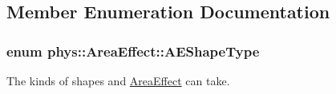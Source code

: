 \subsection{Member Enumeration Documentation}
\hypertarget{classphys_1_1AreaEffect_a99b8746c43eac266d48ad613110dc6f9}{
\subsubsection[{AEShapeType}]{\setlength{\rightskip}{0pt plus 5cm}enum {\bf phys::AreaEffect::AEShapeType}}}
\label{d4/d55/classphys_1_1AreaEffect_a99b8746c43eac266d48ad613110dc6f9}


The kinds of shapes and \hyperlink{classphys_1_1AreaEffect}{AreaEffect} can take. 

